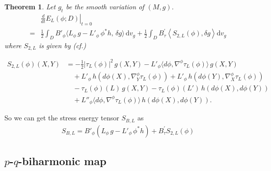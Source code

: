 \documentclass[12pt,UTF8]{article}
\theoremstyle{plain}
\newtheorem{thm}{Theorem}[section]
\theoremstyle{definition}
\def\d {\mathrm{d}}
\renewcommand{\d}[1]{\mathbb{#1}}
\renewcommand{\(}{\left(}
\renewcommand{\)}{\right)}
\numberwithin{equation}{subsection}
\renewcommand{\(}{\left(}
\renewcommand{\)}{\right)}
\def\d{\mathrm{d}}
\def \d {\mathrm{d}}
\numberwithin{equation}{section}
\begin{document}
\begin{thm}\label{thm:stressL} Let $g_t$ be the smooth variation of $(M,g)$.
	\begin{equation}
		\begin{split}
			&\left.\frac{d}{dt}E_L(\phi;D)\right|_{t=0}\\
			=& \frac{1}{2}\int_D B'_\phi \langle L_\phi\,g - L'_\phi\,\phi^*h,\,\delta g\rangle\, \d v_g+\frac{1}{2} \int_D B^\prime_\tau \left\langle S_{2,L}(\phi) ,\delta g \right\rangle \d v_g
		\end{split}
	\end{equation}
	where $S_{2,L} $ is given by (cf.\cite{zbMATH06527253})
	
	\begin{equation}\label{eq:S2L}
		\begin{split}
			S_{2,L}(\phi)(X,Y)
			&= -\frac{1}{2}|\tau_L(\phi)|^2\,g(X,Y)
			- L'_\phi\langle d\phi,\nabla^\phi\tau_L(\phi)\rangle\,g(X,Y) \\
			&\quad + L'_\phi\,h(d\phi(X),\nabla^\phi_Y\tau_L(\phi))
			+ L'_\phi\,h(d\phi(Y),\nabla^\phi_X\tau_L(\phi)) \\
			&\quad - \tau_L(\phi)(L)\,g(X,Y)
			- \tau_L(\phi)(L')\,h(d\phi(X),d\phi(Y)) \\
			&\quad + L''_\phi\langle d\phi,\nabla^\phi\tau_L(\phi)\rangle\,h(d\phi(X),d\phi(Y)).
		\end{split}
	\end{equation}
\end{thm}

So we can get the stress energy tensor $S_{B,L}$  as 
\begin{equation}
	\begin{split}
		S_{B,L}	=B'_\phi \left(  L_\phi\,g - L'_\phi\,\phi^*h \right)+B^\prime_\tau  S_{2,L}(\phi) 
	\end{split}
\end{equation}




\subsection{$p$-$q$-biharmonic map}
\end{document}
